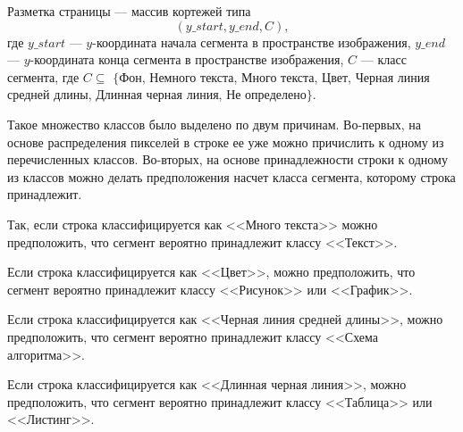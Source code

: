 Разметка страницы --- массив кортежей типа
$$
(y\_start, y\_end, C),
$$
где $y\_start$ --- $y$-координата начала сегмента в пространстве изображения, $y\_end$ --- $y$-координата конца сегмента в пространстве изображения, $C$ --- класс сегмента, где $C \subseteq$ $\{$Фон, Немного текста, Много текста, Цвет, Черная линия средней длины, Длинная черная линия, Не определено$\}$.

Такое множество классов было выделено по двум причинам.
Во-первых, на основе распределения пикселей в строке ее уже можно причислить к одному из перечисленных классов.
Во-вторых, на основе принадлежности строки к одному из классов можно делать предположения насчет класса сегмента, которому строка принадлежит.

Так, если строка классифицируется как <<Много текста>> можно предположить, что сегмент вероятно принадлежит классу <<Текст>>.

Если строка классифицируется как <<Цвет>>, можно предположить, что сегмент вероятно принадлежит классу <<Рисунок>> или <<График>>.

Если строка классифицируется как <<Черная линия средней длины>>, можно предположить, что сегмент вероятно принадлежит классу <<Схема алгоритма>>.

Если строка классифицируется как <<Длинная черная линия>>, можно предположить, что сегмент вероятно принадлежит классу <<Таблица>> или <<Листинг>>.

